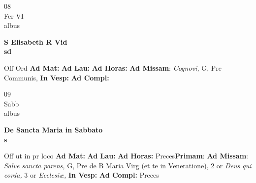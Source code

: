 \documentclass[10pt, openany]{book}
\begin{document}
        \begin{center}
            \begin{minipage}{3.5in}
                \vspace{2em}
                \begin{minipage}{0.5in}
                    {\Huge 08} \\
                    {\normalsize Fer VI} \\
                    {\normalsize albus}
                \end{minipage}
                \begin{minipage}{3.0in}
                    \textbf{ \large S Elisabeth R Vid \\
                    \textnormal{\normalsize sd}} \\ 
                \end{minipage}
                \begin{justify}Off Ord
                    \textbf{Ad Mat: }
                    \textbf{Ad Lau: }
                    \textbf{Ad Horas: }\textbf{Ad Missam}: \textit{Cognovi,} G, Pre Communis,  
                    \textbf{In Vesp: }
                    \textbf{Ad Compl: }
                \end{justify}
            \end{minipage}
        \end{center}
    
        \begin{center}
            \begin{minipage}{3.5in}
                \vspace{2em}
                \begin{minipage}{0.5in}
                    {\Huge 09} \\
                    {\normalsize Sabb} \\
                    {\normalsize albus}
                \end{minipage}
                \begin{minipage}{3.0in}
                    \textbf{ \large De Sancta Maria in Sabbato \\
                    \textnormal{\normalsize s}} \\ 
                \end{minipage}
                \begin{justify}Off ut in pr loco
                    \textbf{Ad Mat: }
                    \textbf{Ad Lau: }
                    \textbf{Ad Horas: }Preces\textbf{Primam}: \textbf{Ad Missam}: \textit{Salve sancta parens,} G, Pre de B Maria Virg (et te in Veneratione), 2 or \textit{Deus qui corda,} 3 or \textit{Ecclesiæ,}  
                    \textbf{In Vesp: }
                    \textbf{Ad Compl: }Preces
                \end{justify}
            \end{minipage}
        \end{center}
    
\end{document}
